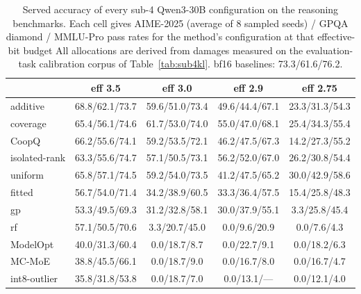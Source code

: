 \begin{table}[t]
\centering\footnotesize
\caption{Served accuracy of every sub-4 Qwen3-30B configuration on the reasoning benchmarks.
Each cell gives AIME-2025 (average of 8 sampled seeds) / GPQA diamond / MMLU-Pro pass rates for
the method's configuration at that effective-bit budget All allocations are derived from damages measured on the
evaluation-task calibration corpus of Table~\ref{tab:sub4kl}. bf16 baselines: 73.3/61.6/76.2.}
\label{tab:sub4served30}
\begin{tabular}{lcccc}
\toprule
 & eff 3.5 & eff 3.0 & eff 2.9 & eff 2.75 \\
\midrule
additive & 68.8/62.1/73.7 & 59.6/51.0/73.4 & 49.6/44.4/67.1 & 23.3/31.3/54.3 \\
coverage & 65.4/56.1/74.6 & 61.7/53.0/74.0 & 55.0/47.0/68.1 & 25.4/34.3/55.4 \\
CoopQ & 66.2/55.6/74.1 & 59.2/53.5/72.1 & 46.2/47.5/67.3 & 14.2/27.3/55.2 \\
isolated-rank & 63.3/55.6/74.7 & 57.1/50.5/73.1 & 56.2/52.0/67.0 & 26.2/30.8/54.4 \\
uniform & 65.8/57.1/74.5 & 59.2/54.0/73.5 & 41.2/47.5/65.2 & 30.0/42.9/58.6 \\
fitted & 56.7/54.0/71.4 & 34.2/38.9/60.5 & 33.3/36.4/57.5 & 15.4/25.8/48.3 \\
gp & 53.3/49.5/69.3 & 31.2/32.8/58.1 & 30.0/37.9/55.1 & 3.3/25.8/45.4 \\
rf & 57.1/50.5/70.6 & 3.3/20.7/45.0 & 0.0/9.6/20.9 & 0.0/7.6/4.3 \\
ModelOpt & 40.0/31.3/60.4 & 0.0/18.7/8.7 & 0.0/22.7/9.1 & 0.0/18.2/6.3 \\
MC-MoE & 38.8/45.5/66.1 & 0.0/18.7/9.0 & 0.0/16.7/8.0 & 0.0/16.7/4.7 \\
int8-outlier & 35.8/31.8/53.8 & 0.0/18.7/7.0 & 0.0/13.1/--- & 0.0/12.1/4.0 \\
\bottomrule
\end{tabular}
\end{table}

